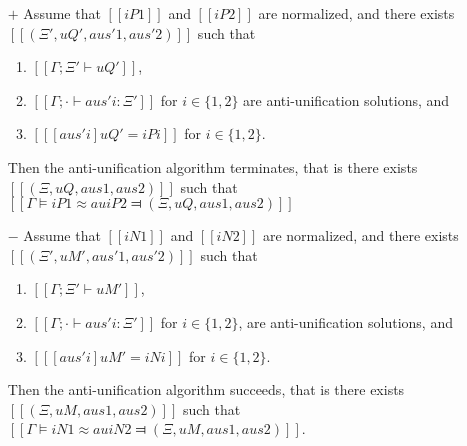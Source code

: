 


\begin{lemma} \label{lemma:au-completeness}
    \hfill
    \begin{itemize}
        \item [$+$] 
            Assume that $[[iP1]]$ and $[[iP2]]$ are normalized, and
            there exists $[[(Ξ', uQ', aus'1, aus'2)]]$ such that
            \begin{enumerate}
                \item $[[Γ ; Ξ' ⊢ uQ']]$,
                \item $[[Γ ; · ⊢ aus'i : Ξ']]$ for $i \in \{1,2\}$ 
                are anti-unification solutions, and
                \item $[[ [aus'i] uQ' = iPi ]]$ for $i \in \{1,2\}$.
            \end{enumerate}

            Then the anti-unification algorithm terminates, that is there exists
            $[[(Ξ, uQ, aus1, aus2)]]$ such that $[[Γ ⊨ iP1 ≈au iP2 ⫤ (Ξ, uQ, aus1, aus2)]]$

        \item [$-$] 
            Assume that $[[iN1]]$ and $[[iN2]]$ are normalized, and
            there exists $[[(Ξ', uM', aus'1, aus'2)]]$ such that
            \begin{enumerate}
                \item $[[Γ ; Ξ' ⊢ uM']]$,
                \item $[[Γ ; · ⊢ aus'i : Ξ']]$ for $i \in \{1,2\}$,
                are anti-unification solutions, and
                \item $[[ [aus'i] uM' = iNi ]]$ for $i \in \{1,2\}$.
            \end{enumerate}

            Then the anti-unification algorithm succeeds, that is 
            there exists $[[(Ξ, uM, aus1, aus2)]]$ such that
            $[[Γ ⊨ iN1 ≈au iN2 ⫤ (Ξ, uM, aus1, aus2)]]$.
    \end{itemize}
\end{lemma}
